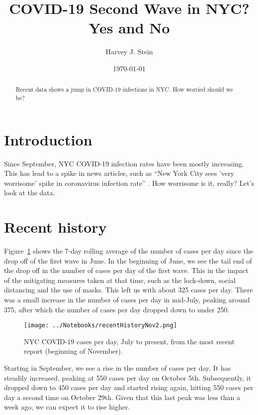 \documentclass[10pt,reqno]{amsart}
\author{Harvey J. Stein}
\date{\today}
\begin{document}
\title{COVID-19 Second Wave in NYC?  Yes and No}

\begin{abstract}
  Recent data shows a jump in COVID-19 infections in NYC.  How worried
  should we be?
\end{abstract}



\maketitle
\tableofcontents

\section{Introduction}
\label{sec:intro}
Since September, NYC COVID-19 infection rates have been mostly
increasing.  This has lead to a spike in news articles, such as ``New
York City sees 'very worrisome' spike in coronavirus infection rate''
\cite{Politico2020Worrisome}.  How worrisome is it, really?  Let's
look at the data.

\section{Recent history}
\label{sec:recent}

Figure~\ref{fig:dailyRecent} shows the 7-day rolling average of the
number of cases per day since the drop off of the first wave in June.
In the beginning of June, we see the tail end of the drop off in the
number of cases per day of the first wave.  This in the impact of the
mitigating measures taken at that time, such as the lock-down, social
distancing and the use of masks.  This left us with about 325 cases
per day.  There was a small increase in the number of cases per day in
mid-July, peaking around 375, after which the number of cases per day
dropped down to under 250.

\begin{figure}[h!tbp]
  \centering
  \texttt{[image: ../Notebooks/recentHistoryNov2.png]}
  \caption{NYC COVID-19 cases per day, July to present, from the most
    recent report (beginning of November).}
  \label{fig:dailyRecent}
\end{figure}

Starting in September, we see a rise in the number of cases per day.
It has steadily increased, peaking at 550 cases per day on October
5th.  Subsequently, it dropped down to 450 cases per day and started
rising again, hitting 550 cases per day a second time on October 29th.
Given that this last peak was less than a week ago, we can expect it
to rise higher.
\end{document}
